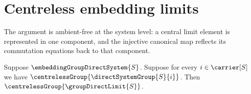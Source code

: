 


\section{Centreless embedding limits}

The argument is ambient-free at the system level: a central limit element is
represented in one component, and the injective canonical map reflects its
commutation equations back to that component.

\begin{theorem}\label{embedding_direct_limit_centreless}
    Suppose $\embeddingGroupDirectSystem{S}$.
    Suppose for every $i\in\carrier[S]$ we have
        $\centrelessGroup{\directSystemGroup{S}{i}}$.
    Then $\centrelessGroup{\groupDirectLimit{S}}$.
\end{theorem}
